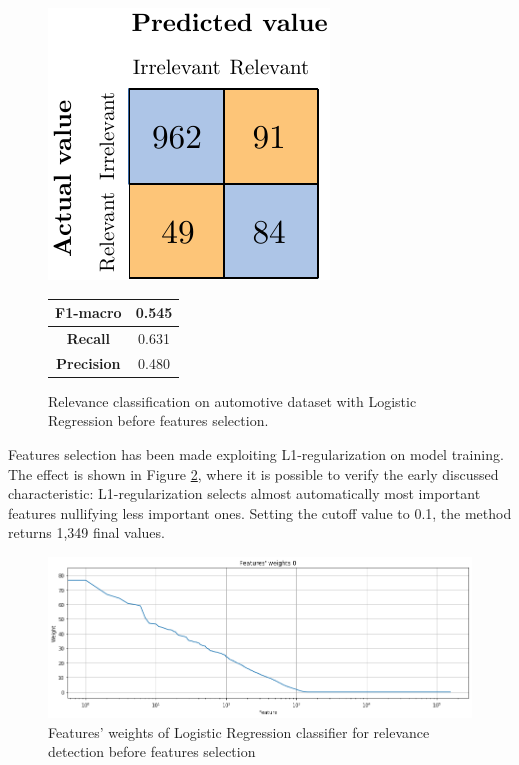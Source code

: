 \begin{figure}[H]
	\begin{minipage}[b]{0.6\linewidth}
		\centering
		\includegraphics[scale=1]{figures/conf_matrices/ita_rel_logreg/ita_rel_logreg_bfs.pdf}
	\end{minipage}
	\begin{minipage}[b]{0.3\linewidth}
		\begin{tabular}[b]{ | c | c | } 
			\hline
			\textbf{F1-macro} & 0.545 \\
			\hline
			\textbf{Recall} & 0.631 \\ 
			\hline
			\textbf{Precision} & 0.480 \\ 
			\hline
		\end{tabular}
	\end{minipage}
	\caption{Relevance classification on automotive dataset with Logistic Regression before features selection.}
	\label{fig:ita_rel_logreg_bfs}
\end{figure}


Features selection has been made exploiting L1-regularization on model training. The effect is shown in Figure \ref{fig:ita_rel_logreg_fs}, where it is possible to verify the early discussed characteristic: L1-regularization selects almost automatically most important features nullifying less important ones. Setting the cutoff value to 0.1, the method returns 1,349 final values.\\

\begin{figure}[H]
	\centering
	\includegraphics[width=\textwidth]{figures/conf_matrices/ita_rel_logreg/ita_rel_logreg_fs.png}
	\caption{Features' weights of Logistic Regression classifier for relevance detection before features selection}
	\label{fig:ita_rel_logreg_fs}
\end{figure}

